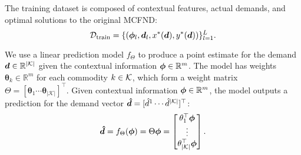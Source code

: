 The training dataset is composed of contextual features, actual demands, and optimal solutions to the original MCFND:
\begin{equation}
    \mathcal{D}_\text{train} = \{({\bm{\phi}}_l, {\bm{d}}_l, x^*({\bm{d}}), y^*({\bm{d}}))\}^L_{l=1}.
\end{equation}

We use a linear prediction model $f_{\Theta}$ to produce a point estimate for the demand ${\bm{d}} \in \mathbb{R}^{|\mathcal{K}|}$ given the contextual information ${\bm{\phi}} \in \mathbb{R}^m$. The model has weights $\bm{\theta}_k \in \mathbb{R}^m$ for each commodity ${k \in \mathcal{K}}$, which form a weight matrix $\Theta = [\bm{\theta}_1 \cdots \bm{\theta}_{|\mathcal{K}|}]^\top$. Given contextual information ${\bm{\phi}} \in \mathbb{R}^m$, the model outputs a prediction for the demand vector ${\bm{\hat{d}}} = [\hat{d}^1 \cdots \hat{d}^{|\mathcal{K}|}]^\top$:
\begin{equation}
    {\bm{\hat{d}}} = f_\Theta({\bm{\phi}}) = \Theta{\bm{\phi}} = \begin{bmatrix}
        \theta_1^\top {\bm{\phi}}\\
        \vdots\\
        \theta^\top_{|\mathcal{K}|} {\bm{\phi}}
    \end{bmatrix}.
\end{equation}

